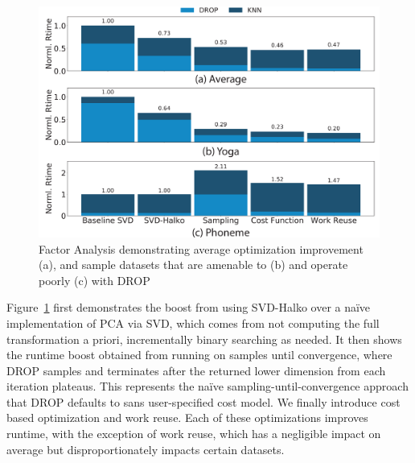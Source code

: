 \begin{figure}
\includegraphics[width=\linewidth]{figs/lesion-all.pdf}
\caption[]{Factor Analysis demonstrating average optimization improvement (a), and sample datasets that are amenable to (b) and operate poorly (c) with DROP}
\label{fig:lesion}
\end{figure}

Figure~\ref{fig:lesion} first demonstrates the boost from using SVD-Halko over a na\"ive implementation of PCA via SVD, which comes from not computing the full transformation a priori, incrementally binary searching as needed. 
It then shows the runtime boost obtained from running on samples until convergence, where DROP samples and terminates after the returned lower dimension from each iteration plateaus.
This represents the na\"ive sampling-until-convergence approach that DROP defaults to sans user-specified cost model.
We finally introduce cost based optimization and work reuse.
Each of these optimizations improves runtime, with the exception of work reuse, which has a negligible impact on average but disproportionately impacts certain datasets. 

